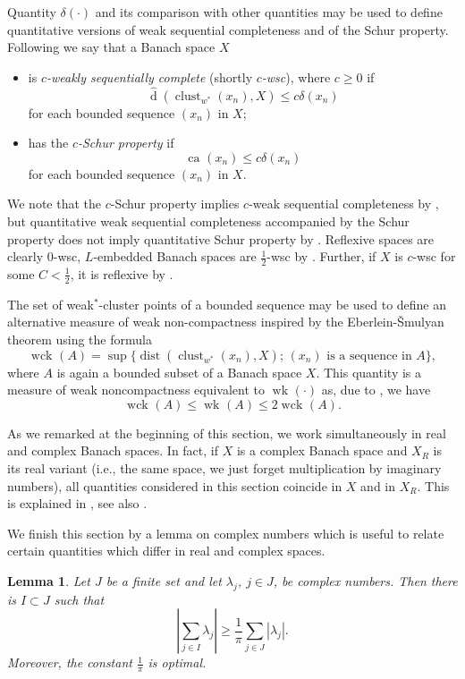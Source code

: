 \documentclass{amsart}
\numberwithin{equation}{section}
\newtheorem{lemma}[thm]{Lemma}
\theoremstyle{definition}
\def\dist{\operatorname{dist}}
\def\dh{\widehat{\operatorname{d}}}
\def\clu#1{\operatorname{clust}_{w^*}(#1)}
\def\de#1{\delta\left(#1\right)}
\newcommand{\ca}[2][]{\operatorname{ca}_{#1}\left(#2\right)}
\newcommand{\wk}[2][]{\operatorname{wk}_{#1}\left(#2\right)}
\newcommand{\wck}[2][]{\operatorname{wck}_{#1}\left(#2\right)}
\newcommand{\abs}[1]{\left|#1\right|}
\newcommand{\setsep}{;\,}
\begin{document}
Quantity $\de{\cdot}$ and its comparison with other quantities may be used to define quantitative versions of weak sequential completeness and of the Schur property. Following \cite{qschur} we say that a Banach space $X$
\begin{itemize}
    \item  is \emph{$c$-weakly sequentially complete} (shortly \emph{$c$-wsc}), where $c\ge 0$ if 
    $$\dh(\clu{x_n},X)\le c \de{x_n}$$
    for each bounded sequence $(x_n)$ in $X$;
    \item has the \emph{$c$-Schur property} if
    $$\ca{x_n}\le c\de{x_n}$$
     for each bounded sequence $(x_n)$ in $X$.
\end{itemize}
We note that the $c$-Schur property implies $c$-weak sequential completeness by \cite[Proposition 1.1]{qschur}, but quantitative weak sequential completeness accompanied by the Schur property does not imply quantitative Schur property by \cite[Example 1.4]{qschur}. Reflexive spaces are clearly $0$-wsc, $L$-embedded Banach spaces are $\frac12$-wsc by \cite[Theorem 1]{wesecom}. Further, if $X$ is $c$-wsc for some $C<\frac12$, it is reflexive by \cite[Proposition 1.2]{qschur}.

The set of weak$^*$-cluster points of a bounded sequence may be used to define an alternative measure
of weak non-compactness inspired by the Eberlein-\v{S}mulyan theorem using the formula
$$\wck{A}=\sup\{\dist(\clu{x_n},X)\setsep (x_n)\mbox{ is a sequence in }A\},$$
where $A$ is again a bounded subset of a Banach space $X$. This quantity is a measure of weak noncompactness equivalent to $\wk{\cdot}$ as, due to \cite{AC-jmaa}, we have
\begin{equation}\label{eq:wck-wk}
    \wck{A}\le\wk{A}\le 2\wck{A}.
\end{equation}

As we remarked at the beginning of this section, we work simultaneously in real and complex Banach spaces. In fact,
if $X$ is a complex Banach space and $X_R$ is its real variant (i.e., the same space, we just forget multiplication by imaginary numbers), all quantities considered in this section coincide in $X$ and in $X_R$. This is explained in \cite[Section 5]{wesecom}, see also \cite[Section 2.1]{qdpp}.

We finish this section by a lemma on complex numbers which is useful to relate certain quantities which differ in real and complex spaces.

\begin{lemma}\label{L:complex}
    Let $J$ be a finite set and let $\lambda_j$, $j\in J$, be complex numbers. Then there is $I\subset J$ such that
    $$\abs{\sum_{j\in I} \lambda_j}\ge\frac1\pi\sum_{j\in J}\abs{\lambda_j}.$$
    Moreover, the constant $\frac1\pi$ is optimal.
\end{lemma}
\end{document}
